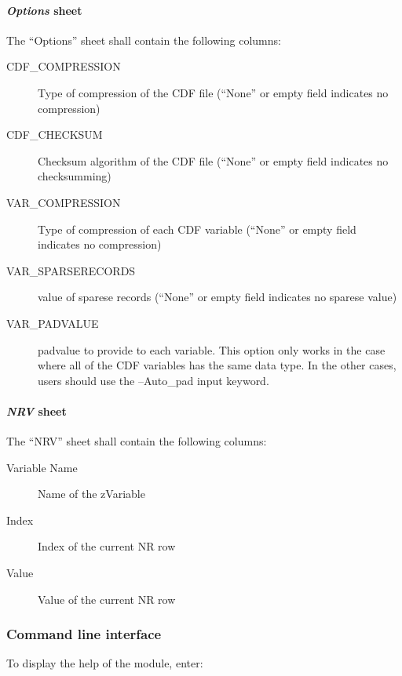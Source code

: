 \documentclass[letterpaper,10pt,english]{sphinxmanual}
\begin{document}
\paragraph{\emph{Options} sheet}
\label{cdf:options-sheet}
The ``Options'' sheet shall contain the following columns:
\begin{description}
\item[{CDF\_COMPRESSION}] \leavevmode
Type of compression of the CDF file (``None'' or empty field indicates no compression)

\item[{CDF\_CHECKSUM}] \leavevmode
Checksum algorithm of the CDF file (``None'' or empty field indicates no checksumming)

\item[{VAR\_COMPRESSION}] \leavevmode
Type of compression of each CDF variable (``None'' or empty field indicates no compression)

\item[{VAR\_SPARSERECORDS}] \leavevmode
value of sparese records (``None'' or empty field indicates no sparese value)

\item[{VAR\_PADVALUE}] \leavevmode
padvalue to provide to each variable. This option only works in the
case where all of the CDF variables has the same data type.
In the other cases, users should use the --Auto\_pad input keyword.

\end{description}


\paragraph{\emph{NRV} sheet}
\label{cdf:nrv-sheet}
The ``NRV'' sheet shall contain the following columns:
\begin{description}
\item[{Variable Name}] \leavevmode
Name of the zVariable

\item[{Index}] \leavevmode
Index of the current NR row

\item[{Value}] \leavevmode
Value of the current NR row

\end{description}


\subsubsection{Command line interface}
\label{cdf:command-line-interface}
To display the help of the module, enter:
\end{document}
